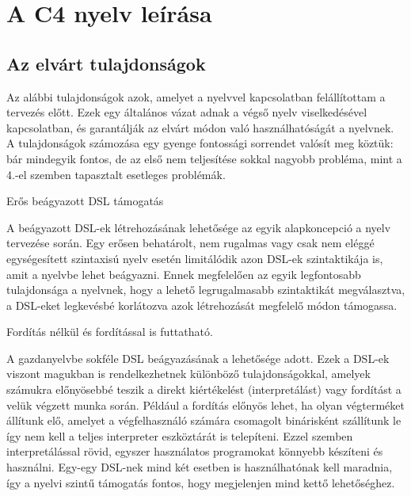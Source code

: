 \section{A C4 nyelv leírása}\label{sec:c4:desc}

\subsection{Az elvárt tulajdonságok}\label{subsec:c4:desc:prop}

Az alábbi tulajdonságok azok, amelyet a nyelvvel kapcsolatban felállítottam a tervezés előtt.
Ezek egy általános vázat adnak a végső nyelv viselkedésével kapcsolatban, és garantálják az elvárt módon való használhatóságát a nyelvnek.
A tulajdonságok számozása egy gyenge fontossági sorrendet valósít meg köztük: bár mindegyik fontos, de az első nem teljesítése sokkal nagyobb probléma, mint a 4.-el szemben tapasztalt esetleges problémák.

\begin{property}\label{prop:dsl-friendly}
    Erős beágyazott \gls{DSL} támogatás

    A beágyazott \gls{DSL}-ek létrehozásának lehetősége az egyik alapkoncepció a nyelv tervezése során.
    Egy erősen behatárolt, nem rugalmas vagy csak nem eléggé egységesített szintaxisú nyelv esetén limitálódik azon \gls{DSL}-ek szintaktikája is, amit a nyelvbe lehet beágyazni.
    Ennek megfelelően az egyik legfontosabb tulajdonsága a nyelvnek, hogy a lehető legrugalmasabb szintaktikát megválasztva, a \gls{DSL}-eket legkevésbé korlátozva azok létrehozását megfelelő módon támogassa.
\end{property}

\begin{property}\label{prop:uncompiled}
    Fordítás nélkül és fordítással is futtatható.

    A gazdanyelvbe sokféle \gls{DSL} beágyazásának a lehetősége adott.
    Ezek a \gls{DSL}-ek viszont magukban is rendelkezhetnek különböző tulajdonságokkal, amelyek számukra előnyösebbé teszik a direkt kiértékelést (interpretálást) vagy fordítást a velük végzett munka során.
    Például a fordítás előnyös lehet, ha olyan végterméket állítunk elő, amelyet a végfelhasználó számára csomagolt binárisként szállítunk le így nem kell a teljes interpreter eszköztárát is telepíteni.
    Ezzel szemben interpretálással rövid, egyszer használatos programokat könnyebb készíteni és használni.
    Egy-egy \gls{DSL}-nek mind két esetben is használhatónak kell maradnia, így a nyelvi szintű támogatás fontos, hogy megjelenjen mind kettő lehetőséghez.
\end{property}

